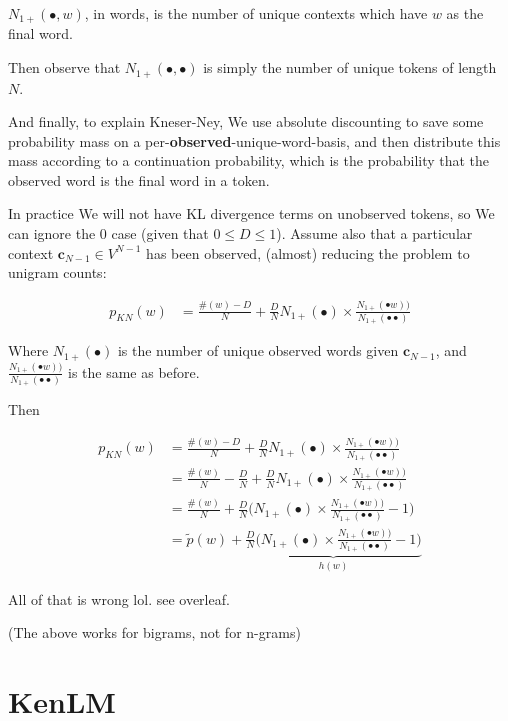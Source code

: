 \documentclass{article}
\newcommand{\context}{\boldsymbol{c}}
\begin{document}
	$N_{1+}(\bullet, w)$, in words, is the number of unique contexts which have $w$ as the final word.
	
	Then observe that $N_{1+}(\bullet, \bullet)$ is simply the number of unique tokens of length $N$.
	
	And finally, to explain Kneser-Ney, We use absolute discounting to save some probability mass on a per-\textbf{observed}-unique-word-basis, and then distribute this mass according to a continuation probability, which is the probability that the observed word is the final word in a token.
	
	In practice We will not have KL divergence terms on unobserved tokens, so We can ignore the $0$ case (given that $0\le D \le 1$). Assume also that a particular context $\context_{N-1}\in V^{N-1}$ has been observed, (almost) reducing the problem to unigram counts:
	
	\begin{align} 
		p_{KN}(w) &= \frac{\#(w) - D}{N} + \frac{D}{N} N_{1+} (\bullet) \times \frac{N_{1+}(\bullet w))}{N_{1+}(\bullet \bullet)}
	\end{align}
	
	Where $N_{1+} (\bullet)$ is the number of unique observed words given $\context_{N-1}$, and $\frac{N_{1+}(\bullet w))}{N_{1+}(\bullet \bullet)}$ is the same as before.
	
	Then
	
	\begin{align} 
		p_{KN}(w) &= \frac{\#(w) - D}{N} + \frac{D}{N} N_{1+} (\bullet) \times \frac{N_{1+}(\bullet w))}{N_{1+}(\bullet \bullet)}\\
		&= \frac{\#(w)}{N} - \frac{D}{N} + \frac{D}{N} N_{1+} (\bullet) \times \frac{N_{1+}(\bullet w))}{N_{1+}(\bullet \bullet)}\\
		&= \frac{\#(w)}{N} + \frac{D}{N}\bigg( N_{1+} (\bullet) \times \frac{N_{1+}(\bullet w))}{N_{1+}(\bullet \bullet)} - 1 \bigg)\\
		&= \tilde{p}(w) + \underbrace{\frac{D}{N}\bigg( N_{1+} (\bullet) \times \frac{N_{1+}(\bullet w))}{N_{1+}(\bullet \bullet)} - 1 \bigg)}_{h(w)}
	\end{align}
	
	All of  that is wrong lol. see overleaf.
	
	(The above works for bigrams, not for n-grams)
	
	
\newpage
\section{KenLM}
\end{document}
